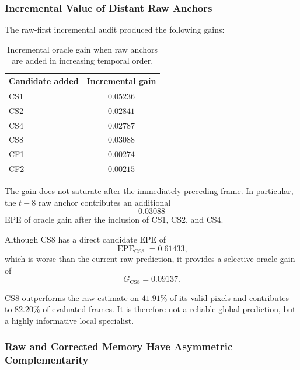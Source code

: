 \documentclass[11pt,a4paper]{article}
\begin{document}
\subsubsection{Incremental Value of Distant Raw Anchors}

The raw-first incremental audit produced the following gains:

\begin{table}[t]
    \centering
    \caption{Incremental oracle gain when raw anchors are added in increasing temporal
    order.}
    \label{tab:incremental_raw_anchor_gain}
    \begin{tabular}{lc}
        \toprule
        Candidate added & Incremental gain \\
        \midrule
        CS1 & \(0.05236\) \\
        CS2 & \(0.02841\) \\
        CS4 & \(0.02787\) \\
        CS8 & \(0.03088\) \\
        CF1 & \(0.00274\) \\
        CF2 & \(0.00215\) \\
        \bottomrule
    \end{tabular}
\end{table}

The gain does not saturate after the immediately preceding frame. In particular, the
\(t-8\) raw anchor contributes an additional
\begin{equation}
    0.03088
\end{equation}
EPE of oracle gain after the inclusion of CS1, CS2, and CS4.

Although CS8 has a direct candidate EPE of
\begin{equation}
    \operatorname{EPE}_{\mathrm{CS8}}
    =
    0.61433,
\end{equation}
which is worse than the current raw prediction, it provides a selective oracle gain of
\begin{equation}
    G_{\mathrm{CS8}}
    =
    0.09137.
\end{equation}

CS8 outperforms the raw estimate on \(41.91\%\) of its valid pixels and contributes to
\(82.20\%\) of evaluated frames. It is therefore not a reliable global prediction, but a
highly informative local specialist.

\subsubsection{Raw and Corrected Memory Have Asymmetric Complementarity}
\end{document}
